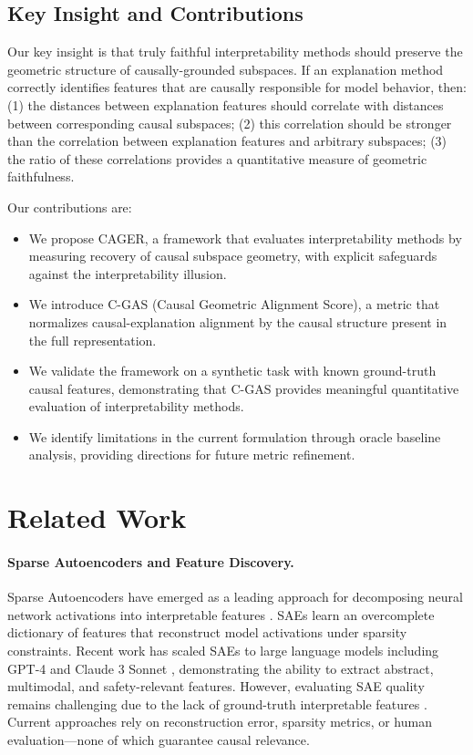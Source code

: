 \documentclass{article}
\begin{document}
\subsection{Key Insight and Contributions}

Our key insight is that truly faithful interpretability methods should preserve the geometric structure of causally-grounded subspaces. If an explanation method correctly identifies features that are causally responsible for model behavior, then: (1) the distances between explanation features should correlate with distances between corresponding causal subspaces; (2) this correlation should be stronger than the correlation between explanation features and arbitrary subspaces; (3) the ratio of these correlations provides a quantitative measure of geometric faithfulness.

Our contributions are:
\begin{itemize}
    \item We propose CAGER, a framework that evaluates interpretability methods by measuring recovery of causal subspace geometry, with explicit safeguards against the interpretability illusion.
    \item We introduce C-GAS (Causal Geometric Alignment Score), a metric that normalizes causal-explanation alignment by the causal structure present in the full representation.
    \item We validate the framework on a synthetic task with known ground-truth causal features, demonstrating that C-GAS provides meaningful quantitative evaluation of interpretability methods.
    \item We identify limitations in the current formulation through oracle baseline analysis, providing directions for future metric refinement.
\end{itemize}

\section{Related Work}

\paragraph{Sparse Autoencoders and Feature Discovery.} Sparse Autoencoders have emerged as a leading approach for decomposing neural network activations into interpretable features \citep{bricken2023monosemanticity,cunningham2023sparse}. SAEs learn an overcomplete dictionary of features that reconstruct model activations under sparsity constraints. Recent work has scaled SAEs to large language models including GPT-4 \citep{gao2024scaling} and Claude 3 Sonnet \citep{templeton2024scaling}, demonstrating the ability to extract abstract, multimodal, and safety-relevant features. However, evaluating SAE quality remains challenging due to the lack of ground-truth interpretable features \citep{karvonen2024identifying}. Current approaches rely on reconstruction error, sparsity metrics, or human evaluation---none of which guarantee causal relevance.
\end{document}
